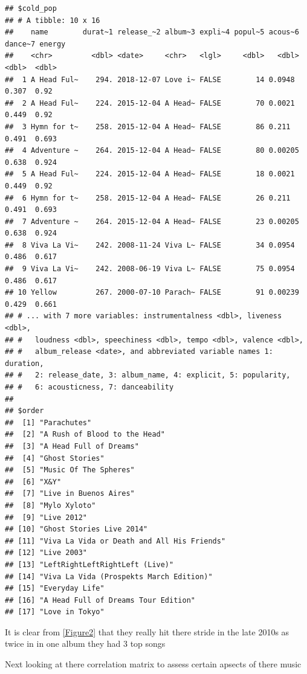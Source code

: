 \documentclass[12pt,preprint, authoryear]{elsarticle}
\numberwithin{equation}{section}
\numberwithin{figure}{section}
\numberwithin{table}{section}
\begin{document}
\begin{verbatim}
## $cold_pop
## # A tibble: 10 x 16
##    name        durat~1 release_~2 album~3 expli~4 popul~5 acous~6 dance~7 energy
##    <chr>         <dbl> <date>     <chr>   <lgl>     <dbl>   <dbl>   <dbl>  <dbl>
##  1 A Head Ful~    294. 2018-12-07 Love i~ FALSE        14 0.0948    0.307  0.92 
##  2 A Head Ful~    224. 2015-12-04 A Head~ FALSE        70 0.0021    0.449  0.92 
##  3 Hymn for t~    258. 2015-12-04 A Head~ FALSE        86 0.211     0.491  0.693
##  4 Adventure ~    264. 2015-12-04 A Head~ FALSE        80 0.00205   0.638  0.924
##  5 A Head Ful~    224. 2015-12-04 A Head~ FALSE        18 0.0021    0.449  0.92 
##  6 Hymn for t~    258. 2015-12-04 A Head~ FALSE        26 0.211     0.491  0.693
##  7 Adventure ~    264. 2015-12-04 A Head~ FALSE        23 0.00205   0.638  0.924
##  8 Viva La Vi~    242. 2008-11-24 Viva L~ FALSE        34 0.0954    0.486  0.617
##  9 Viva La Vi~    242. 2008-06-19 Viva L~ FALSE        75 0.0954    0.486  0.617
## 10 Yellow         267. 2000-07-10 Parach~ FALSE        91 0.00239   0.429  0.661
## # ... with 7 more variables: instrumentalness <dbl>, liveness <dbl>,
## #   loudness <dbl>, speechiness <dbl>, tempo <dbl>, valence <dbl>,
## #   album_release <date>, and abbreviated variable names 1: duration,
## #   2: release_date, 3: album_name, 4: explicit, 5: popularity,
## #   6: acousticness, 7: danceability
## 
## $order
##  [1] "Parachutes"                               
##  [2] "A Rush of Blood to the Head"              
##  [3] "A Head Full of Dreams"                    
##  [4] "Ghost Stories"                            
##  [5] "Music Of The Spheres"                     
##  [6] "X&Y"                                      
##  [7] "Live in Buenos Aires"                     
##  [8] "Mylo Xyloto"                              
##  [9] "Live 2012"                                
## [10] "Ghost Stories Live 2014"                  
## [11] "Viva La Vida or Death and All His Friends"
## [12] "Live 2003"                                
## [13] "LeftRightLeftRightLeft (Live)"            
## [14] "Viva La Vida (Prospekts March Edition)"   
## [15] "Everyday Life"                            
## [16] "A Head Full of Dreams Tour Edition"       
## [17] "Love in Tokyo"
\end{verbatim}

It is clear from \ref{Figure2} that they really hit there stride in the
late 2010s as twice in in one album they had 3 top songs

Next looking at there correlation matrix to assess certain apsects of
there music
\end{document}

